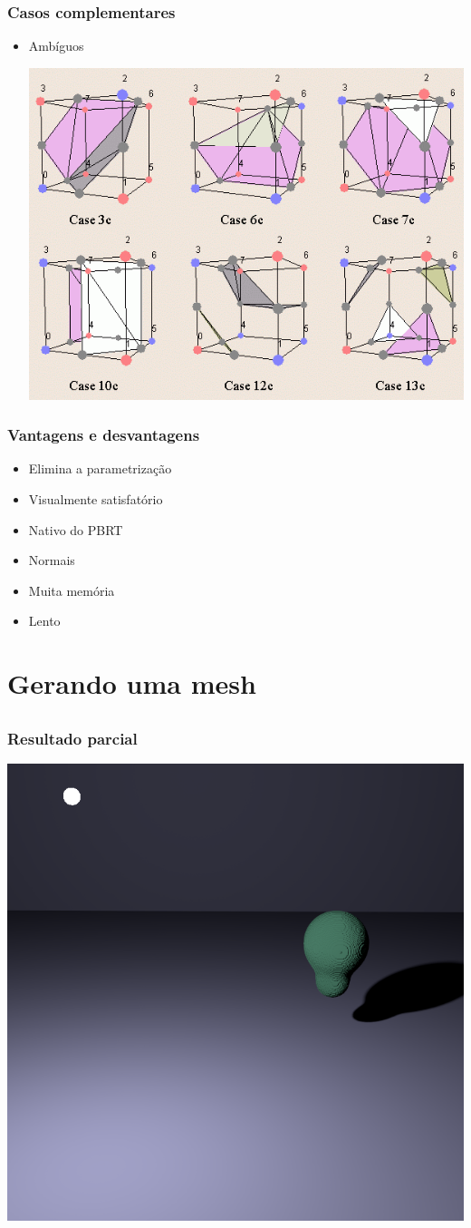 \documentclass[brazil]{beamer}
\begin{document}
    \begin{frame}
      \frametitle{Casos complementares}
        \begin{itemize}
          \item Ambíguos
            \begin{center}
              \includegraphics[width=.6\textwidth]{imgs/ambiguous-cases.png}
            \end{center}
        \end{itemize}
    \end{frame}        

    \begin{frame}
      \frametitle{Vantagens e desvantagens}
        \begin{itemize}
          \item Elimina a parametrização
          \item Visualmente satisfatório
          \item Nativo do PBRT
          \item Normais
          \item Muita memória
          \item Lento
        \end{itemize}
    \end{frame}        

  \section{Gerando uma mesh}
  
    \subsection{}
    
      \begin{frame}
        \frametitle{Resultado parcial}
        \begin{center}
          \includegraphics[width=.6\textwidth]{imgs/metaball-preview.png}
        \end{center}
      \end{frame}
  
\end{document}
